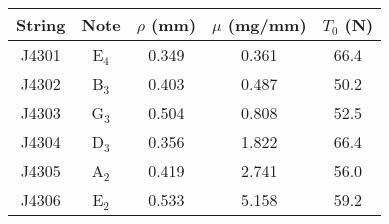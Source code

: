 \begin{tabular}{ccccc}
\toprule
String & Note & $\rho$ (mm) & $\mu$ (mg/mm) & $T_0$ (N) \\
\midrule
J4301 & E$_{4}$ & 0.349 & 0.361 & 66.4 \\
J4302 & B$_{3}$ & 0.403 & 0.487 & 50.2 \\
J4303 & G$_{3}$ & 0.504 & 0.808 & 52.5 \\
J4304 & D$_{3}$ & 0.356 & 1.822 & 66.4 \\
J4305 & A$_{2}$ & 0.419 & 2.741 & 56.0 \\
J4306 & E$_{2}$ & 0.533 & 5.158 & 59.2 \\
\bottomrule
\end{tabular}

